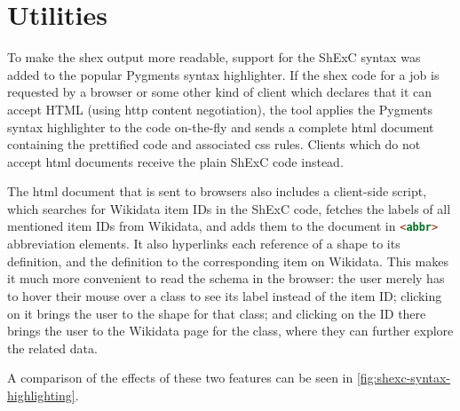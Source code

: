 \section{Utilities}
\label{sec:wdsi:utilities}

To make the \gls{shex} output more readable,
support for the ShExC syntax was added to the popular Pygments syntax highlighter. %
If the \gls{shex} code for a job %
is requested by a browser
or some other kind of client which declares that it can accept HTML
(using \gls{http} content negotiation),
the tool applies the Pygments syntax highlighter to the code on-the-fly
and sends a complete \gls{html} document containing the prettified code and associated \gls{css} rules.
Clients which do not accept \gls{html} documents receive the plain ShExC code instead.

The \gls{html} document that is sent to browsers
also includes a client-side script,
which searches for \gls{Wikidata} \glspl{item ID} in the ShExC code,
fetches the \glspl{label} of all mentioned \glspl{item ID} from \gls{Wikidata},
and adds them to the document in \lstinline[language=html]{<abbr>} abbreviation elements.
It also hyperlinks each reference of a \gls{shape} to its definition,
and the definition to the corresponding \gls{item} on \gls{Wikidata}.
This makes it much more convenient to read the \gls{schema} in the browser:
the user merely has to hover their mouse over a class to see its \gls{label} instead of the \gls{item ID};
clicking on it brings the user to the \gls{shape} for that class;
and clicking on the ID there brings the user to the \gls{Wikidata} page for the class,
where they can further explore the related data.

A comparison of the effects of these two features
can be seen in \cref{fig:shexc-syntax-highlighting}.

